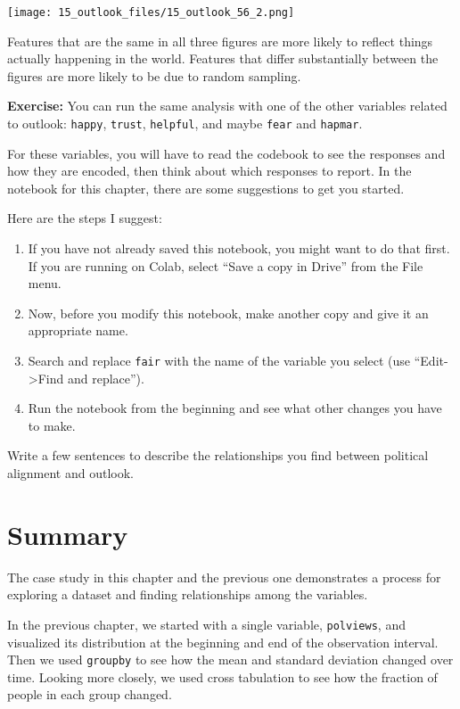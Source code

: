 \begin{center}
\texttt{[image: 15\_outlook\_files/15\_outlook\_56\_2.png]}
\end{center}

Features that are the same in all three figures are more likely to
reflect things actually happening in the world. Features that differ
substantially between the figures are more likely to be due to random
sampling.

\textbf{Exercise:} You can run the same analysis with one of the other
variables related to outlook: \passthrough{\lstinline!happy!},
\passthrough{\lstinline!trust!}, \passthrough{\lstinline!helpful!}, and
maybe \passthrough{\lstinline!fear!} and
\passthrough{\lstinline!hapmar!}.

For these variables, you will have to read the codebook to see the
responses and how they are encoded, then think about which responses to
report. In the notebook for this chapter, there are some suggestions to
get you started.

Here are the steps I suggest:

\begin{enumerate}
\def\labelenumi{\arabic{enumi})}
\item
  If you have not already saved this notebook, you might want to do that
  first. If you are running on Colab, select ``Save a copy in Drive''
  from the File menu.
\item
  Now, before you modify this notebook, make another copy and give it an
  appropriate name.
\item
  Search and replace \passthrough{\lstinline!fair!} with the name of the
  variable you select (use ``Edit-\textgreater Find and replace'').
\item
  Run the notebook from the beginning and see what other changes you
  have to make.
\end{enumerate}

Write a few sentences to describe the relationships you find between
political alignment and outlook.

\section{Summary}\label{summary}

The case study in this chapter and the previous one demonstrates a
process for exploring a dataset and finding relationships among the
variables.

In the previous chapter, we started with a single variable,
\passthrough{\lstinline!polviews!}, and visualized its distribution at
the beginning and end of the observation interval. Then we used
\passthrough{\lstinline!groupby!} to see how the mean and standard
deviation changed over time. Looking more closely, we used cross
tabulation to see how the fraction of people in each group changed.

